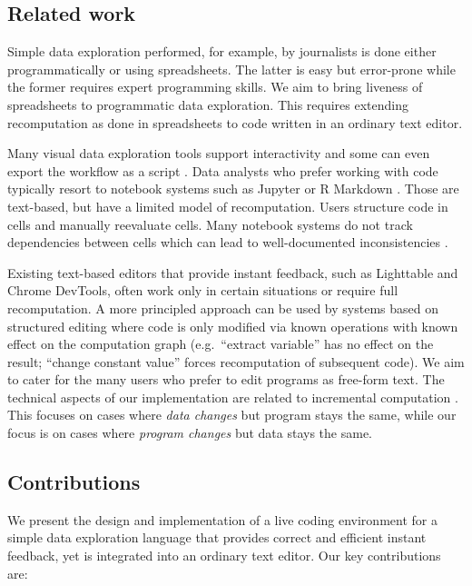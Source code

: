 \documentclass[english,submission]{programming}
\theoremstyle{plain}
\theoremstyle{definition}
\begin{document}
\subsection{Related work}
Simple data exploration performed, for example, by journalists \cite{ddj} is done either
programmatically or using spreadsheets. The latter is easy but error-prone while the former
requires expert programming skills. We aim to bring liveness of spreadsheets to programmatic
data exploration. This requires extending recomputation as done in spreadsheets \cite{spreadsheet}
to code written in an ordinary text editor.

Many visual data exploration tools support interactivity \cite{control,tableau,vizdom} and some
can even export the workflow as a script \cite{wrangler}. Data analysts who prefer working with
code typically resort to notebook systems such as Jupyter or R Markdown \cite{jupyter,rmarkdown}.
Those are text-based, but have a limited model of recomputation. Users structure code in
cells and manually reevaluate cells. Many notebook systems do not track dependencies
between cells which can lead to well-documented inconsistencies \cite{dataflow,noworkflow,wrattler}.

Existing text-based editors that provide instant feedback,
such as Lighttable \cite{lighttable} and Chrome DevTools, often work only in certain
situations or require full recomputation. A more principled approach can be used by
systems based on structured editing \cite{livenut,lamdu} where code is only
modified via known operations with known effect on the computation graph
(e.g.~``extract variable'' has no effect on the result; ``change constant value''
forces recomputation of subsequent code). We aim to cater for the many users who
prefer to edit programs as free-form text.
%
The technical aspects of our implementation are related to incremental computation \cite{selfadjusting,incremental}.
This focuses on cases where \emph{data changes} but program stays the same, while our focus is on cases where
\emph{program changes} but data stays the same.

\subsection{Contributions}
We present the design and implementation of a live coding environment for a simple data exploration
language that provides correct and efficient instant feedback, yet is integrated into an
ordinary text editor. Our key contributions are:
\end{document}
